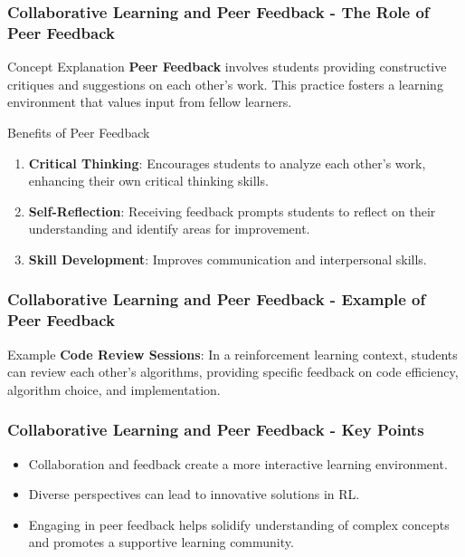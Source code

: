 \documentclass[aspectratio=169]{beamer}
\begin{document}
\begin{frame}[fragile]
    \frametitle{Collaborative Learning and Peer Feedback - The Role of Peer Feedback}
    \begin{block}{Concept Explanation}
        \textbf{Peer Feedback} involves students providing constructive critiques and suggestions on each other’s work. This practice fosters a learning environment that values input from fellow learners.
    \end{block}

    \begin{block}{Benefits of Peer Feedback}
        \begin{enumerate}
            \item \textbf{Critical Thinking}: Encourages students to analyze each other's work, enhancing their own critical thinking skills.
            \item \textbf{Self-Reflection}: Receiving feedback prompts students to reflect on their understanding and identify areas for improvement.
            \item \textbf{Skill Development}: Improves communication and interpersonal skills.
        \end{enumerate}
    \end{block}
\end{frame}

\begin{frame}[fragile]
    \frametitle{Collaborative Learning and Peer Feedback - Example of Peer Feedback}
    \begin{block}{Example}
        \textbf{Code Review Sessions}: In a reinforcement learning context, students can review each other's algorithms, providing specific feedback on code efficiency, algorithm choice, and implementation.
    \end{block}
\end{frame}

\begin{frame}[fragile]
    \frametitle{Collaborative Learning and Peer Feedback - Key Points}
    \begin{itemize}
        \item Collaboration and feedback create a more interactive learning environment.
        \item Diverse perspectives can lead to innovative solutions in RL.
        \item Engaging in peer feedback helps solidify understanding of complex concepts and promotes a supportive learning community.
    \end{itemize}
\end{frame}
\end{document}
